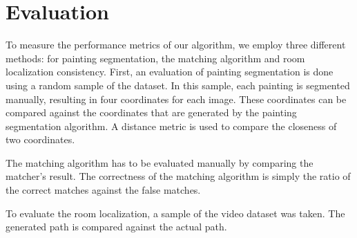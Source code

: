 \section{Evaluation}
	To measure the performance metrics of our algorithm, we employ three different methods: for painting segmentation, the matching algorithm and room localization consistency. First, an evaluation of painting segmentation is done using a random sample of the dataset. In this sample, each painting is segmented manually, resulting in four coordinates for each image. These coordinates can be compared against the coordinates that are generated by the painting segmentation algorithm. A distance metric is used to compare the closeness of two coordinates.
	
	The matching algorithm has to be evaluated manually by comparing the matcher's result. The correctness of the matching algorithm is simply the ratio of the correct matches against the false matches.
	
	To evaluate the room localization, a sample of the video dataset was taken. The generated path is compared against the actual path.